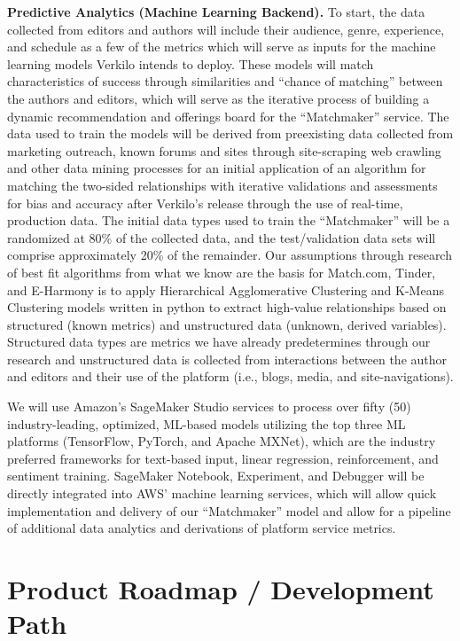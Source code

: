 \documentclass[10pt,openany]{book}
\begin{document}
\textbf{Predictive Analytics (Machine Learning Backend).} To start, the
data collected from editors and authors will include their audience,
genre, experience, and schedule as a few of the metrics which will serve
as inputs for the machine learning models Verkilo intends to deploy.
These models will match characteristics of success through similarities
and ``chance of matching'' between the authors and editors, which will
serve as the iterative process of building a dynamic recommendation and
offerings board for the ``Matchmaker'' service. The data used to train
the models will be derived from preexisting data collected from
marketing outreach, known forums and sites through site-scraping web
crawling and other data mining processes for an initial application of
an algorithm for matching the two-sided relationships with iterative
validations and assessments for bias and accuracy after Verkilo's
release through the use of real-time, production data. The initial data
types used to train the ``Matchmaker'' will be a randomized at 80\% of
the collected data, and the test/validation data sets will comprise
approximately 20\% of the remainder. Our assumptions through research of
best fit algorithms from what we know are the basis for Match.com,
Tinder, and E-Harmony is to apply Hierarchical Agglomerative Clustering
and K-Means Clustering models written in python to extract high-value
relationships based on structured (known metrics) and unstructured data
(unknown, derived variables). Structured data types are metrics we have
already predetermines through our research and unstructured data is
collected from interactions between the author and editors and their use
of the platform (i.e., blogs, media, and site-navigations).

We will use Amazon's SageMaker Studio services to process over fifty
(50) industry-leading, optimized, ML-based models utilizing the top
three ML platforms (TensorFlow, PyTorch, and Apache MXNet), which are
the industry preferred frameworks for text-based input, linear
regression, reinforcement, and sentiment training. SageMaker Notebook,
Experiment, and Debugger will be directly integrated into AWS' machine
learning services, which will allow quick implementation and delivery of
our ``Matchmaker'' model and allow for a pipeline of additional data
analytics and derivations of platform service metrics.

\hypertarget{product-roadmap-development-path}{%
\section{Product Roadmap / Development
Path}\label{product-roadmap-development-path}}
\end{document}
